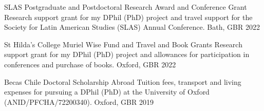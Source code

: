 \begin{cvhonors}
\cvhonor
{SLAS Postgraduate and Postdoctoral Research Award and Conference Grant} 
{Research support grant for my DPhil (PhD) project and travel support for the Society for Latin American Studies (SLAS) Annual Conference.} %
{Bath, GBR}
{2022}
\end{cvhonors}

\vspace{1mm}

\begin{cvhonors}
\cvhonor
{St Hilda's College Muriel Wise Fund and Travel and Book Grants} %
{Research support grant for my DPhil (PhD) project and allowances for participation in conferences and purchase of books.}  %
{Oxford, GBR}
{2022}
\end{cvhonors}

\vspace{1mm}

\begin{cvhonors}
\cvhonor
{Becas Chile Doctoral Scholarship Abroad} 
{Tuition fees, transport and living expenses for pursuing a DPhil (PhD) at the University of Oxford (ANID/PFCHA/72200340).} %
{Oxford, GBR}
{2019}
\end{cvhonors}

\vspace{1mm}






